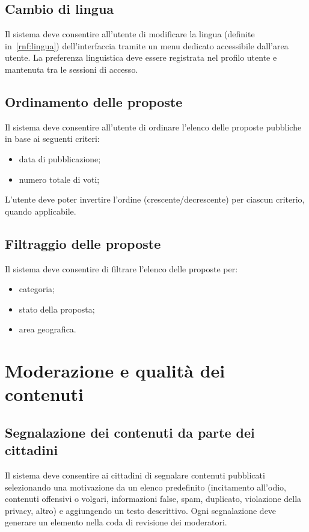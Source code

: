 \begin{rfscope}
\subsection{Cambio di lingua} \label{rf:cambiolingua}
Il sistema deve consentire all’utente di modificare la lingua (definite in~\ref{rnf:lingua}) dell’interfaccia tramite un menu dedicato accessibile dall’area utente.
La preferenza linguistica deve essere registrata nel profilo utente e mantenuta tra le sessioni di accesso.

\subsection{Ordinamento delle proposte}  \label{rf:ordinamentoproposte}
Il sistema deve consentire all’utente di ordinare l’elenco delle proposte pubbliche in base ai seguenti criteri:
\begin{itemize}
  \item data di pubblicazione;
  \item numero totale di voti;
\end{itemize}

L’utente deve poter invertire l’ordine (crescente/decrescente) per ciascun criterio, quando applicabile.


\subsection{Filtraggio delle proposte} \label{rf:filtroproposte}
Il sistema deve consentire di filtrare l’elenco delle proposte per:
\begin{itemize}
  \item categoria;
  \item stato della proposta;
  \item area geografica.
\end{itemize}

\section{Moderazione e qualità dei contenuti}

\subsection{Segnalazione dei contenuti da parte dei cittadini} \label{rf:segnalazione}
Il sistema deve consentire ai cittadini di segnalare contenuti pubblicati selezionando una motivazione da un elenco predefinito
(incitamento all’odio, contenuti offensivi o volgari, informazioni false, spam, duplicato, violazione della privacy, altro) e aggiungendo un testo descrittivo.
Ogni segnalazione deve generare un elemento nella coda di revisione dei moderatori.


\end{rfscope}
